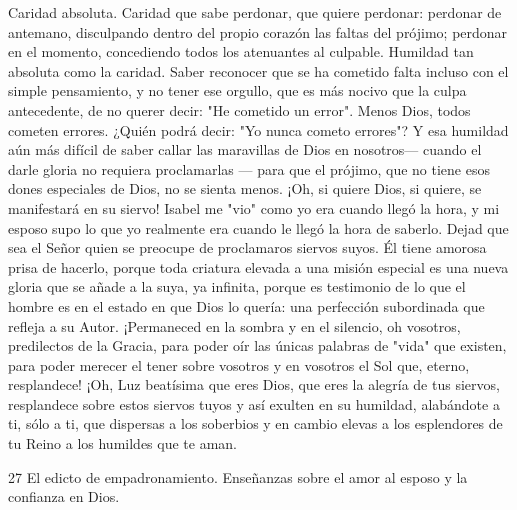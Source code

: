 \documentclass[12pt]{book} %
\begin{document}
Caridad absoluta. Caridad que sabe perdonar, que quiere perdonar: perdonar de antemano, disculpando dentro del 
propio corazón las faltas del prójimo; perdonar en el momento, concediendo todos los atenuantes al culpable. 
Humildad tan absoluta como la caridad. Saber reconocer que se ha cometido falta incluso con el simple pensamiento, y no tener ese orgullo, que es más nocivo que la culpa antecedente, de no querer decir: "He cometido un error". Menos Dios, todos cometen errores. ¿Quién podrá decir: "Yo nunca cometo errores"? Y esa humildad aún más difícil de saber callar las maravillas de Dios en nosotros— cuando el darle gloria no requiera proclamarlas — para que el prójimo, que no tiene esos dones especiales de Dios, no se sienta menos. ¡Oh, si quiere Dios, si quiere, se manifestará en su siervo! Isabel me "vio" como yo era cuando llegó la hora, y mi esposo supo lo que yo realmente era cuando le llegó la hora de saberlo. 
Dejad que sea el Señor quien se preocupe de proclamaros siervos suyos. Él tiene amorosa prisa de hacerlo, porque toda 
criatura elevada a una misión especial es una nueva gloria que se añade a la suya, ya infinita, porque es testimonio de lo que el hombre es en el estado en que Dios lo quería: una perfección subordinada que refleja a su Autor. ¡Permaneced en la sombra y en el silencio, oh vosotros, predilectos de la Gracia, para poder oír las únicas palabras de "vida" que existen, para poder merecer el tener sobre vosotros y en vosotros el Sol que, eterno, resplandece! 
¡Oh, Luz beatísima que eres Dios, que eres la alegría de tus siervos, resplandece sobre estos siervos tuyos y así exulten 
en su humildad, alabándote a ti, sólo a ti, que dispersas a los soberbios y en cambio elevas a los esplendores de tu Reino a los humildes que te aman. 
 
 
27 
El edicto de empadronamiento. Enseñanzas sobre el amor al esposo y la confianza en Dios. 
 
\end{document}
